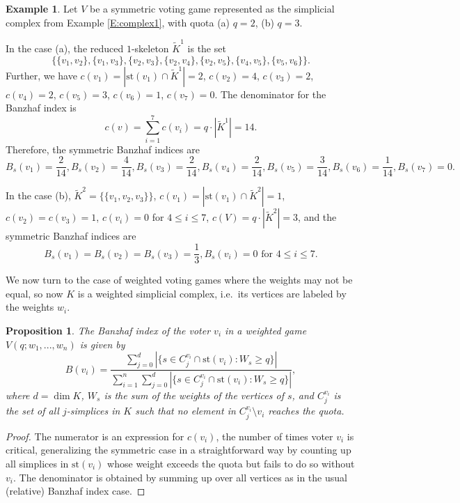 \documentclass[11pt]{amsart}
\newcommand{\ifn}[1]{\footnote{{\bf Ismar: }#1}} %
\theoremstyle{plain}
\newtheorem{prop}[thm]{Proposition}
\theoremstyle{definition}
\newtheorem{example}[thm]{Example}
\theoremstyle{remark}
\begin{document}
\begin{example}
Let $V$ be a symmetric voting game represented as the simplicial complex from Example \ref{E:complex1}, with quota (a) $q=2$, (b) $q=3$.%

In the case (a), the reduced $1$-skeleton $\widetilde{K}^{1}$ is the set $$\{\{v_1, v_2\}, \{v_1, v_3\}, \{v_2, v_3\}, \{v_2, v_4\}, \{v_2, v_5\}, \{v_4, v_5\}, \{v_5, v_6\}\}.$$ Further, we have $c(v_1)=|\text{st}(v_1)\cap \widetilde{K}^{1}|=2$, $c(v_2)=4$, $c(v_3)=2$, $c(v_4)=2$, $c(v_5)=3$, $c(v_6)=1$, $c(v_7)=0$. The denominator for the Banzhaf index is
$$c(v)=\sum_{i=1}^7 c(v_i)=q\cdot |\widetilde{K}^{1}|=14.$$ Therefore, the symmetric Banzhaf indices are $$B_s (v_1)=\frac{2}{14}, B_s (v_2)=\frac{4}{14}, B_s (v_3)=\frac{2}{14}, B_s (v_4)=\frac{2}{14}, B_s (v_5)=\frac{3}{14}, B_s (v_6)=\frac{1}{14}, B_s (v_7)=0.$$

In the case (b), $\widetilde{K}^{2}=\{\{v_1, v_2, v_3\}\}$, $c(v_1)=|\text{st}(v_1)\cap \widetilde{K}^{2}|=1$, $c(v_2)=c(v_3)=1$, $c(v_i)=0$ for $4\leq i \leq 7$, $c(V)=q\cdot |\widetilde{K}^{2}|=3$, and the symmetric Banzhaf indices are $$B_s (v_1)=B_s (v_2)=B_s (v_3)=\frac{1}{3}, B_s (v_i)=0 \text{ for } 4\leq i \leq 7.$$
\end{example}


We now turn to the case of weighted voting games where the weights may not be equal, so now $K$ is a weighted simplicial complex, i.e.~its vertices are labeled by the weights $w_i$. 

\begin{prop}
The Banzhaf index of the voter $v_i$ in a weighted game $V(q;w_1,...,w_n)$ is given by
$$B(v_i)=\frac{\sum_{j=0}^d |\{s\in C_{j}^{v_i} \cap \text{st}(v_i): W_s \geq q\}|}{\sum_{i=1}^n \sum_{j=0}^d |\{s\in C_{j}^{v_i} \cap \text{st}(v_i): W_s \geq q\}|},$$
where $d=\dim K$, $W_s$ is the sum of the weights of the vertices of $s$, and $C_{j}^{v_i}$ is the set of all $j$-simplices in $K$ such that no element in $C_{j}^{v_i} \setminus v_i$ reaches the quota.
\end{prop}

\begin{proof}
The numerator is an expression for $c(v_i)$, the number of times voter $v_i$ is critical, generalizing the symmetric case in a straightforward way by counting up all simplices in $\text{st}(v_i)$ whose weight exceeds the quota but fails to do so without $v_i$. The denominator is obtained by summing up over all vertices as in the usual (relative) Banzhaf index case.
\end{proof}
\end{document}
